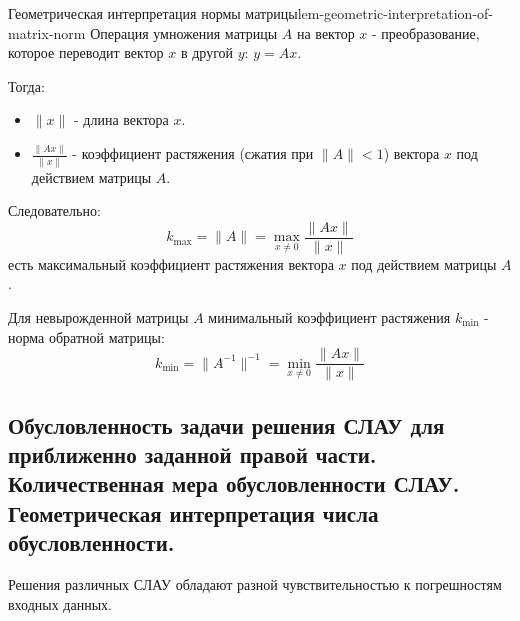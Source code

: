 \documentclass[14pt]{extarticle}
\begin{document}
    \clearpage
    \begin{lemma}{Геометрическая интерпретация нормы матрицы}{lem-geometric-interpretation-of-matrix-norm}
        Операция умножения матрицы $A$ на вектор $x$ - преобразование, которое переводит вектор $x$ в другой $y$: $y = Ax$.

        \vspace{\baselineskip}
        
        Тогда:
        \begin{itemize}
            \item $\|x\|$ - длина вектора $x$.
            \item $\frac{\|Ax\|}{\|x\|}$ - коэффициент растяжения (сжатия при $\|A\| < 1$) вектора $x$ под действием матрицы $A$.
        \end{itemize}
        
        \vspace{\baselineskip}
        
        Следовательно:
        $$k_{\max} = \|A\| = \max_{x \neq 0} \frac{\|Ax\|}{\|x\|}$$
        есть максимальный коэффициент растяжения вектора $x$ под действием матрицы $A$.
    
        \vspace{\baselineskip}

        Для невырожденной матрицы $A$ минимальный коэффициент растяжения $k_{\min}$ - норма обратной матрицы:
        $$k_{\min} = \|A^{-1}\|^{-1} = \min_{x \neq 0} \frac{\|Ax\|}{\|x\|}$$
    \end{lemma}

\clearpage
\subsection{Обусловленность задачи решения СЛАУ для приближенно заданной правой части. Количественная мера обусловленности СЛАУ. Геометрическая интерпретация числа обусловленности.}

    Решения различных СЛАУ обладают разной чувствительностью к погрешностям входных данных.
\end{document}
